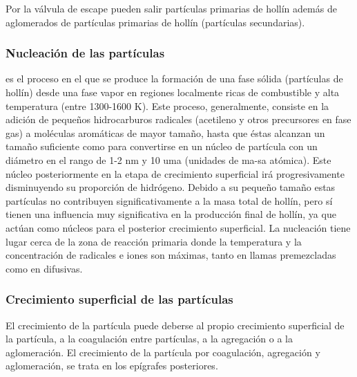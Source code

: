 \par Por la válvula de escape pueden salir partículas primarias de hollín además de aglomerados de partículas primarias de hollín (partículas secundarias).

\subsubsection{Nucleación de las partículas}\label{subsubsec:nucleacion}

\par es el proceso en el que se produce la formación de una fase sólida (partículas de hollín) desde una fase vapor en regiones localmente ricas de combustible y alta temperatura (entre 1300-1600 K). Este proceso, generalmente, consiste en la adición de pequeños hidrocarburos radicales (acetileno y otros precursores en fase gas) a moléculas aromáticas de mayor tamaño, hasta que éstas alcanzan un tamaño suficiente como para convertirse en un núcleo de partícula con un diámetro en el rango de 1-2 nm y 10 uma (unidades de ma-sa atómica). Este núcleo posteriormente en la etapa de crecimiento superficial irá progresivamente disminuyendo su proporción de hidrógeno. Debido a su pequeño tamaño estas partículas no contribuyen significativamente a la masa total de hollín, pero sí tienen una influencia muy significativa en la producción final de hollín, ya que actúan como núcleos para el posterior crecimiento superficial. La nucleación tiene lugar cerca de la zona de reacción primaria donde la temperatura y la concentración de radicales e iones son máximas, tanto en llamas premezcladas como en difusivas. 

\subsubsection{Crecimiento superficial de las partículas}\label{subsubsec:crecimientosuperficial}

\par El crecimiento de la partícula puede deberse al propio crecimiento superficial de la partícula, a la coagulación entre partículas, a la agregación o a la aglomeración. El crecimiento de la partícula por coagulación, agregación y aglomeración, se trata en los epígrafes posteriores.

